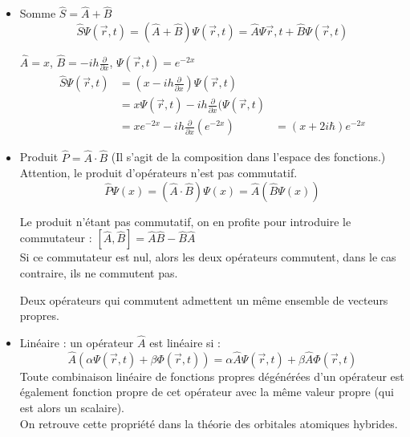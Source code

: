 \documentclass[../main.tex]{subfile}
\begin{document}
\begin{itemize}
      \begin{itemize} 
            \item Somme $\hat{S} = \hat{A} + \hat{B}$\\
               $$\hat{S} \Psi(\vec{r}, t) = (\hat{A} + \hat{B}) \Psi(\vec{r}, t) = \hat{A} \Psi{\vec{r}, t} + \hat{B} \Psi(\vec{r}, t)$$
               \begin{ex} 
                  $\hat{A} = x$, $\hat{B} = -ih\frac{\partial}{\partial x}$, $\Psi(\vec{r}, t) = e^{-2x}$ \\
                  $$
                    \begin{aligned} 
                       \hat{S} \Psi(\vec{r}, t) &= (x - ih\frac{\partial}{\partial x}) \Psi(\vec{r}, t)\\
                       &= x \Psi(\vec{r}, t) - ih\frac{\partial}{\partial x} (\Psi(\vec{r}, t)\\
                       &= xe^{-2x}-ih\frac{\partial}{\partial x} (e^{-2x})
                       &= (x+2i\hbar)e^{-2x}
                    \end{aligned}
                  $$
               \end{ex}

            \item Produit $\hat{P} = \hat{A} \cdot \hat{B}$ (Il s'agit de la composition dans l'espace des fonctions.)\\
               Attention, le produit d'opérateurs n'est pas commutatif.\\
               $$\hat{P} \Psi(x) = (\hat{A} \cdot \hat{B}) \Psi(x) = \hat{A} (\hat{B} \Psi(x))$$

               Le produit n'étant pas commutatif, on en profite pour introduire le commutateur :
               $[\hat{A}, \hat{B}] = \hat{A} \hat{B} - \hat{B} \hat{A}$\\
               Si ce commutateur est nul, alors les deux opérateurs commutent, dans le cas contraire, ils ne commutent pas.\\
              \begin{rema} 
                  Deux opérateurs qui commutent admettent un même ensemble de vecteurs propres.\\
              \end{rema}

            \item Linéaire : un opérateur $\hat{A}$ est linéaire si : 
               $$\hat{A}(\alpha \Psi(\vec{r}, t) + \beta \Phi(\vec{r}, t)) = \alpha \hat{A} \Psi(\vec{r}, t) + \beta \hat{A} \Phi(\vec{r}, t)$$
               Toute combinaison linéaire de fonctions propres dégénérées d'un opérateur est également fonction propre de cet opérateur avec la même valeur propre (qui est alors un scalaire).\\
               On retrouve cette propriété dans la théorie des orbitales atomiques hybrides.\\


\end{itemize}
\end{itemize}
\end{document}
